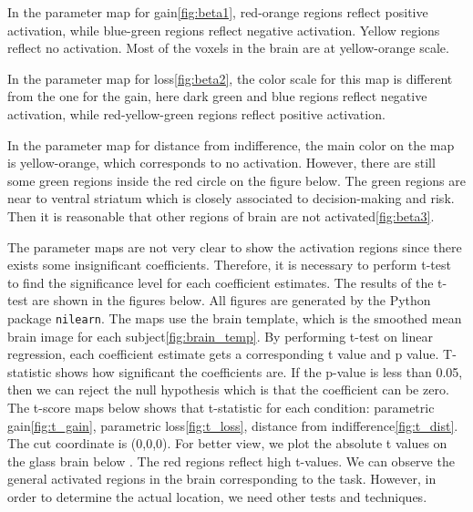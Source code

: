 
\par \indent In the parameter map for gain\ref{fig:beta1}, red-orange regions reflect positive activation, while blue-green regions reflect negative activation. Yellow regions reflect no activation. Most of the voxels in the brain are at yellow-orange scale.

\par \indent In the parameter map for loss\ref{fig:beta2},  the color scale for this map is different from the one for the gain, here dark green and blue regions reflect negative activation, while red-yellow-green regions reflect positive activation. 

\par \indent In the parameter map for distance from indifference, the main color on the map is yellow-orange, which corresponds to no activation. However, there are still some green regions inside the red circle on the figure below. The green regions are near to ventral striatum which is closely associated to decision-making and risk. Then it is reasonable that other regions of brain are not activated\ref{fig:beta3}.

\par \indent The parameter maps are not very clear to show the activation regions since there exists some insignificant coefficients. Therefore, it is necessary to perform t-test to find the significance level for each coefficient estimates. The results of the t-test are shown in the figures below. All figures are generated by the Python package \texttt{nilearn}. The maps use the brain template, which is the smoothed mean brain image for each subject\ref{fig:brain_temp}. By performing t-test on linear regression, each coefficient estimate gets a corresponding t value and p value. T-statistic shows how significant the coefficients are. If the p-value is less than 0.05, then we can reject the null hypothesis which is that the coefficient can be zero. The t-score maps below shows that t-statistic for each condition: parametric gain\ref{fig:t_gain}, parametric loss\ref{fig:t_loss}, distance from indifference\ref{fig:t_dist}. The cut coordinate is (0,0,0). For better view, we plot the absolute t values on the glass brain below . The red regions reflect high t-values. We can observe the general activated regions in the brain corresponding to the task. However, in order to determine the actual location, we need other tests and techniques.

